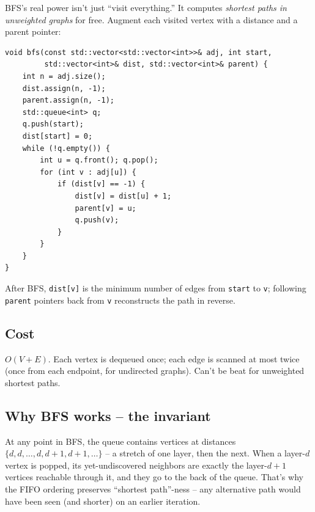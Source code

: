\documentclass[11pt]{article}
\begin{document}
BFS's real power isn't just ``visit everything.'' It computes \emph{shortest paths in unweighted graphs} for free. Augment each visited vertex with a distance and a parent pointer:

\begin{lstlisting}[basicstyle=\ttfamily\small,frame=single]
void bfs(const std::vector<std::vector<int>>& adj, int start,
         std::vector<int>& dist, std::vector<int>& parent) {
    int n = adj.size();
    dist.assign(n, -1);
    parent.assign(n, -1);
    std::queue<int> q;
    q.push(start);
    dist[start] = 0;
    while (!q.empty()) {
        int u = q.front(); q.pop();
        for (int v : adj[u]) {
            if (dist[v] == -1) {
                dist[v] = dist[u] + 1;
                parent[v] = u;
                q.push(v);
            }
        }
    }
}
\end{lstlisting}

After BFS, \texttt{dist[v]} is the minimum number of edges from \texttt{start} to \texttt{v}; following \texttt{parent} pointers back from \texttt{v} reconstructs the path in reverse.

\subsection*{Cost}

$O(V + E)$. Each vertex is dequeued once; each edge is scanned at most twice (once from each endpoint, for undirected graphs). Can't be beat for unweighted shortest paths.

\subsection*{Why BFS works -- the invariant}

\begin{ideabox}
At any point in BFS, the queue contains vertices at distances $\{d, d, \ldots, d, d+1, d+1, \ldots\}$ -- a stretch of one layer, then the next. When a layer-$d$ vertex is popped, its yet-undiscovered neighbors are exactly the layer-$d+1$ vertices reachable through it, and they go to the back of the queue. That's why the FIFO ordering preserves ``shortest path''-ness -- any alternative path would have been seen (and shorter) on an earlier iteration.
\end{ideabox}
\end{document}

